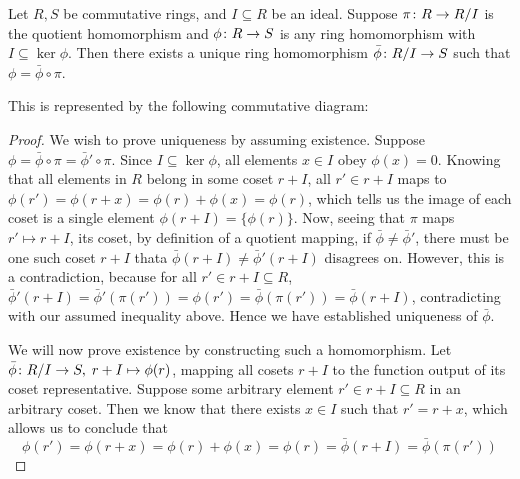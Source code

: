\begin{theorem}\label{thm:univ-prop-quotient-ring}
    Let \(R,S\) be commutative rings,
    and \(I \subseteq R\) be an ideal.
    Suppose \(\pi\colon R\to R/I\) is the quotient homomorphism
    and \(\phi\colon R\to S\) is any ring homomorphism
    with \(I \subseteq \ker\phi\).
    Then there exists a unique ring homomorphism
    \(\bar{\phi}\colon R/I\to S\) such that \(\phi = \bar{\phi}\circ\pi\).

    This is represented by the following commutative diagram:
    \begin{center}
    \end{center}
\end{theorem}
\begin{proof}
    We wish to prove uniqueness by assuming existence.
    Suppose \(\phi = \bar{\phi}\circ\pi = \bar{\phi}'\circ\pi\).
    Since \(I \subseteq \ker\phi\),
    all elements \(x \in I\) obey \(\phi(x) = 0\).
    Knowing that all elements in \(R\) belong in some coset \(r+I\),
    all \(r' \in r+I\) maps to \(\phi(r') = \phi(r+x) = \phi(r)+\phi(x) = \phi(r)\),
    which tells us the image of each coset
    is a single element \(\phi(r+I) = \{\phi(r)\}\).
    Now, seeing that \(\pi \) maps \(r' \mapsto r+I\), its coset,
    by definition of a quotient mapping,
    if \(\bar{\phi} \neq \bar{\phi}'\),
    there must be one such coset \(r+I\)
    thata \(\bar{\phi}(r+I) \neq \bar{\phi}'(r+I)\) disagrees on.
    However, this is a contradiction,
    because for all \(r' \in r+I \subseteq R\),
    \(\bar{\phi}'(r+I) = \bar{\phi}'(\pi(r')) = \phi(r')
    = \bar{\phi}(\pi(r')) = \bar{\phi}(r+I)\),
    contradicting with our assumed inequality above.
    Hence we have established uniqueness of \(\bar{\phi}\).

    We will now prove existence by constructing such a homomorphism.
    Let \(\bar{\phi}\colon R/I\to S,\;r+I\mapsto\phi(r)\),
    mapping all cosets \(r+I\) to the function output of its coset representative.
    Suppose some arbitrary element \(r' \in r+I \subseteq R\)
    in an arbitrary coset.
    Then we know that there exists \(x \in I\) such that \(r' = r+x\),
    which allows us to conclude that
    \begin{equation*}
        \phi(r') = \phi(r+x) = \phi(r) + \phi(x)
        = \phi(r) = \bar{\phi}(r+I) = \bar{\phi}(\pi(r'))
    \end{equation*}
\end{proof}

